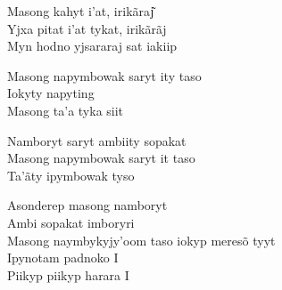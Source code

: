 \smallskip
\begin{center}\end{center}
\smallskip

\noindent Masong kahyt i'at, irikãraj͂\\
Yjxa pitat i'at tykat, irikãrãj\\
Myn hodno yjsararaj sat iakiip

\smallskip
\begin{center}\end{center}
\smallskip

\noindent Masong napymbowak saryt ity taso\\
Iokyty napyting\\
Masong ta'a tyka siit

\smallskip
\begin{center}\end{center}
\smallskip

\noindent Namboryt saryt ambiity sopakat\\
Masong napymbowak saryt it taso\\
Ta'ãty ipymbowak tyso

\smallskip
\begin{center}\end{center}
\smallskip

\noindent Asonderep masong namboryt\\
Ambi sopakat imboryri\\
Masong naymbykyjy'oom taso iokyp meresõ tyyt\\
Ipynotam padnoko I\\
Piikyp piikyp harara I

